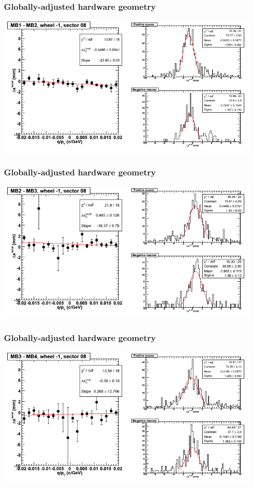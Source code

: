 \documentclass[compress]{beamer}
\begin{document}
\begin{frame}
\frametitle{Globally-adjusted hardware geometry}
\includegraphics[width=\linewidth]{NOV4_segdiffs_HW/dt13_resid_B_08_12.png}
\end{frame}

\begin{frame}
\frametitle{Globally-adjusted hardware geometry}
\includegraphics[width=\linewidth]{NOV4_segdiffs_HW/dt13_resid_B_08_23.png}
\end{frame}

\begin{frame}
\frametitle{Globally-adjusted hardware geometry}
\includegraphics[width=\linewidth]{NOV4_segdiffs_HW/dt13_resid_B_08_34.png}
\end{frame}
\end{document}
